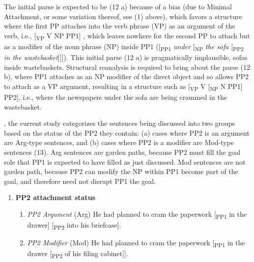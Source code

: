 \documentclass[12pt,oneside]{book}
\providecommand{\tightlist}{%
  \setlength{\itemsep}{0pt}\setlength{\parskip}{0pt}}
\begin{document}
The initial parse is expected to be (12 a) because of a bias (due to Minimal Attachment, or some variation thereof, see (1) above), which favors a structure where the first PP attaches into the verb phrase (VP) as an argument of the verb, i.e., {[}\textsubscript{VP} V NP PP1{]} , which leaves nowhere for the second PP to attach but as a modifier of the noun phrase (NP) inside PP1 ({[}\textsubscript{PP1} \emph{under} {[}\textsubscript{NP} \emph{the sofa} {[}\textsubscript{PP2} \emph{in the wastebasket}{]}{]}{]}). This initial parse (12 a) is pragmatically implausible,  sofas  inside wastebaskets. Structural reanalysis is required to bring about the  parse (12 b), where PP1 attaches as an NP modifier of the direct object and so allows PP2 to attach as a VP argument, resulting in a structure such as {[}\textsubscript{VP} V {[}\textsubscript{NP} N PP1{]} PP2{]}, i.e., where  the newspapers under the sofa  are being crammed in the wastebasket.

, the current study categorizes the sentences being discussed into two groups based on the status of the PP2 they contain: (a) cases where PP2 is an argument  are  Arg-type sentences, and (b) cases where PP2 is a modifier  are  Mod-type sentences  (13).  Arg sentences  are  garden paths, because PP2 must fill the goal role that PP1 is expected to have filled as just discussed. Mod sentences are not  garden path, because PP2 can modify the NP within PP1  become part of the goal, and therefore need not disrupt PP1 the goal.

\begin{enumerate}
\def\labelenumi{(\arabic{enumi})}
\setcounter{enumi}{12}
\tightlist
\item
  \textbf{PP2 attachment status}

  \begin{enumerate}
  \def\labelenumii{(\alph{enumii})}
  \tightlist
  \item
    \emph{PP2 Argument} (Arg) \linebreak
    He had planned to cram the paperwork {[}\textsubscript{PP1} in the drawer{]} {[}\textsubscript{PP2} into his briefcase{]}.
  \item
    \emph{PP2 Modifier} (Mod) \linebreak
    He had planned to cram the paperwork {[}\textsubscript{PP1} in the drawer {[}\textsubscript{PP2} of his filing cabinet{]}{]}.
  \end{enumerate}
\end{enumerate}
\end{document}

